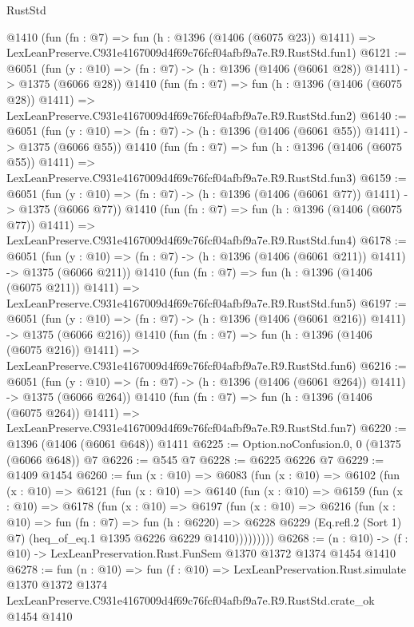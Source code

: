 \begin{lexlean}{RustStd}
\begin{coremodule}
    @1410
    (fun (fn : @7) =>
    fun (h : @1396 (@1406 (@6075 @23)) @1411) =>
    LexLeanPreserve.C931e4167009d4f69c76fcf04afbf9a7e.R9.RustStd.fun1)
@6121 := @6051
    (fun (y : @10) => (fn : @7) -> (h : @1396 (@1406 (@6061 @28)) @1411) -> @1375 (@6066 @28))
    @1410
    (fun (fn : @7) =>
    fun (h : @1396 (@1406 (@6075 @28)) @1411) =>
    LexLeanPreserve.C931e4167009d4f69c76fcf04afbf9a7e.R9.RustStd.fun2)
@6140 := @6051
    (fun (y : @10) => (fn : @7) -> (h : @1396 (@1406 (@6061 @55)) @1411) -> @1375 (@6066 @55))
    @1410
    (fun (fn : @7) =>
    fun (h : @1396 (@1406 (@6075 @55)) @1411) =>
    LexLeanPreserve.C931e4167009d4f69c76fcf04afbf9a7e.R9.RustStd.fun3)
@6159 := @6051
    (fun (y : @10) => (fn : @7) -> (h : @1396 (@1406 (@6061 @77)) @1411) -> @1375 (@6066 @77))
    @1410
    (fun (fn : @7) =>
    fun (h : @1396 (@1406 (@6075 @77)) @1411) =>
    LexLeanPreserve.C931e4167009d4f69c76fcf04afbf9a7e.R9.RustStd.fun4)
@6178 := @6051
    (fun (y : @10) => (fn : @7) -> (h : @1396 (@1406 (@6061 @211)) @1411) -> @1375 (@6066 @211))
    @1410
    (fun (fn : @7) =>
    fun (h : @1396 (@1406 (@6075 @211)) @1411) =>
    LexLeanPreserve.C931e4167009d4f69c76fcf04afbf9a7e.R9.RustStd.fun5)
@6197 := @6051
    (fun (y : @10) => (fn : @7) -> (h : @1396 (@1406 (@6061 @216)) @1411) -> @1375 (@6066 @216))
    @1410
    (fun (fn : @7) =>
    fun (h : @1396 (@1406 (@6075 @216)) @1411) =>
    LexLeanPreserve.C931e4167009d4f69c76fcf04afbf9a7e.R9.RustStd.fun6)
@6216 := @6051
    (fun (y : @10) => (fn : @7) -> (h : @1396 (@1406 (@6061 @264)) @1411) -> @1375 (@6066 @264))
    @1410
    (fun (fn : @7) =>
    fun (h : @1396 (@1406 (@6075 @264)) @1411) =>
    LexLeanPreserve.C931e4167009d4f69c76fcf04afbf9a7e.R9.RustStd.fun7)
@6220 := @1396 (@1406 (@6061 @648)) @1411
@6225 := Option.noConfusion.{0, 0} (@1375 (@6066 @648)) @7
@6226 := @545 @7
@6228 := @6225 @6226 @7
@6229 := @1409 @1454
@6260 := fun (x : @10) =>
  @6083
    (fun (x : @10) =>
    @6102
      (fun (x : @10) =>
      @6121
        (fun (x : @10) =>
        @6140
          (fun (x : @10) =>
          @6159
            (fun (x : @10) =>
            @6178
              (fun (x : @10) =>
              @6197
                (fun (x : @10) =>
                @6216
                  (fun (x : @10) =>
                  fun (fn : @7) =>
                  fun (h : @6220) =>
                  @6228
                    @6229
                    (Eq.refl.{2} (Sort 1) @7)
                    (heq_of_eq.{1} @1395 @6226 @6229 @1410)))))))))
@6268 := (n : @10) -> (f : @10) -> LexLeanPreservation.Rust.FunSem @1370 @1372 @1374 @1454 @1410
@6278 := fun (n : @10) =>
  fun (f : @10) =>
  LexLeanPreservation.Rust.simulate
    @1370
    @1372
    @1374
    LexLeanPreserve.C931e4167009d4f69c76fcf04afbf9a7e.R9.RustStd.crate_ok
    @1454
    @1410
\end{coremodule}
\end{lexlean}
